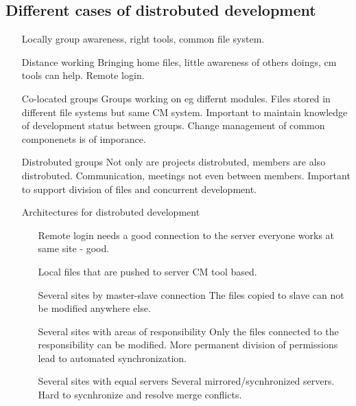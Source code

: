 \documentclass{article}
\begin{document}
    \subsection{ Different cases of distrobuted development}
    \begin{itemize}
    \item [Locally] group awareness, right tools, common file system.
    \item [Distance working] Bringing home files, little awareness of others doings, cm tools can help. Remote login.
    \item [Co-located groups] Groups working on eg differnt modules. Files stored in different file systems but same CM system. Important to maintain knowledge of development status between groups. Change management of common componenets is of imporance.
    \item [Distrobuted groups] Not only are projects distrobuted, members are also distrobuted. Communication, meetings not even between members. Important to support division of files and concurrent development.
    \item [Architectures for distrobuted development]
    \begin{itemize}
    \item [Remote login] needs a good connection to the server everyone works at same site - good.
    \item [Local files that are pushed to server] CM tool based.
    \item [ Several sites by master-slave connection] The files copied to slave can not be modified anywhere else.
    \item [ Several sites with areas of responsibility] Only the files connected to the responsibility can be modified. More permanent division of permissions lead to automated synchronization.
    \item [ Several sites with equal servers ] Several mirrored/sycnhronized servers. Hard to sycnhronize and resolve merge conflicts.



\end{itemize}
\end{itemize}
\end{document}
